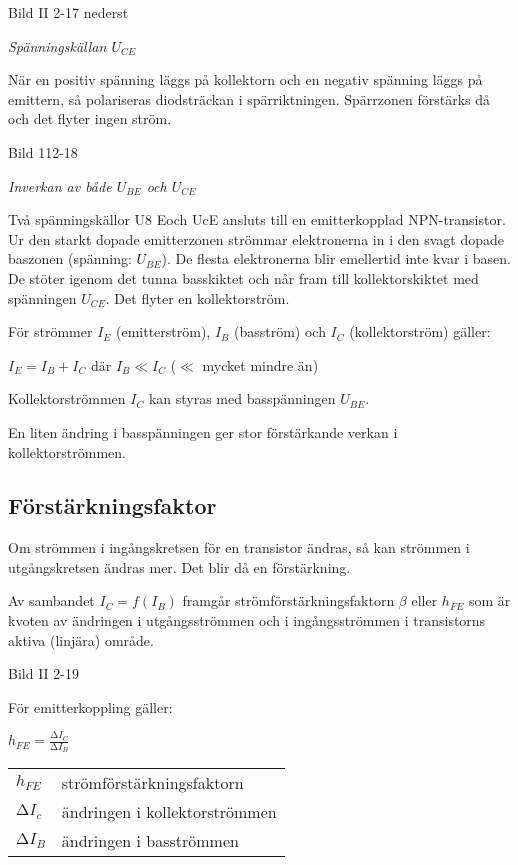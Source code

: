 Bild II 2-17 nederst

\emph{Spänningskällan \(U_{CE}\)}

När en positiv spänning läggs på kollektorn och en negativ spänning läggs på
emittern, så polariseras diodsträckan i spärriktningen. Spärrzonen förstärks då
och det flyter ingen ström.

Bild 112-18

\emph{Inverkan av både \(U_{BE}\) och \(U_{CE}\)}

Två spänningskällor U8 Eoch UcE ansluts till en emitterkopplad NPN-transistor.
Ur den starkt dopade emitterzonen strömmar elektronerna in i den svagt dopade
baszonen (spänning: \(U_{BE}\)). De flesta elektronerna blir emellertid inte
kvar i basen. De stöter igenom det tunna basskiktet och når fram till
kollektorskiktet med spänningen \(U_{CE}\). Det flyter en kollektorström.

För strömmer \(I_E\) (emitterström), \(I_B\) (basström) och \(I_C\)
(kollektorström) gäller:

\(I_E = I_B + I_C\) där \(I_B \ll I_C\) (\(\ll\) mycket mindre än)

Kollektorströmmen \(I_C\) kan styras med basspänningen \(U_{BE}\).

En liten ändring i basspänningen ger stor förstärkande verkan i
kollektorströmmen.

\subsection{Förstärkningsfaktor}

Om strömmen i ingångskretsen för en transistor ändras, så kan strömmen i
utgångskretsen ändras mer. Det blir då en förstärkning.

Av sambandet \(I_C = f(I_B)\) framgår strömförstärkningsfaktorn \(\beta\) eller
\(h_{FE}\) som är kvoten av ändringen i utgångsströmmen och i ingångsströmmen i
transistorns aktiva (linjära) område.

Bild II 2-19

För emitterkoppling gäller:

\(h_{FE} = \frac{∆I_C}{∆I_B}\)

\begin{tabular}{ll}
  \(h_{FE}\) & strömförstärkningsfaktorn \\
  \(∆I_c\)   & ändringen i kollektorströmmen \\
  \(∆I_B\)   & ändringen i basströmmen \\
\end{tabular}

